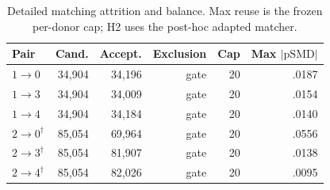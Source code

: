 \documentclass[notspecified,article,submit,moreauthors]{Definitions/mdpi}
\begin{document}
\begin{table}[H]
\caption{ROI-preservation and null-control checks. Exact ROI equality at the
final model input was a binding requirement; any violation would terminate the
run. All 30 configuration--seed evaluations completed without a violation. In
the ROI-only control, donor periphery is excluded, so a null HCS/HCE response is
the expected invariant output rather than an estimated biological effect.}
\label{tab:preservation}
\centering
\scriptsize
\setlength{\tabcolsep}{2.8pt}
\end{table}

\begin{table}[H]
\caption{Detailed matching attrition and balance. Max reuse is the frozen
per-donor cap; H2 uses the post-hoc adapted matcher.}
\label{tab:supp_matching}
\centering
\scriptsize
\begin{tabular}{@{}lrrrrr@{}}
\toprule
Pair & Cand. & Accept. & Exclusion & Cap & Max $|\mathrm{pSMD}|$ \\
\midrule
$1\rightarrow0$ & 34,904 & 34,196 & gate & 20 & .0187 \\
$1\rightarrow3$ & 34,904 & 34,009 & gate & 20 & .0154 \\
$1\rightarrow4$ & 34,904 & 34,184 & gate & 20 & .0140 \\
$2\rightarrow0^\dagger$ & 85,054 & 69,964 & gate & 20 & .0556 \\
$2\rightarrow3^\dagger$ & 85,054 & 81,907 & gate & 20 & .0138 \\
$2\rightarrow4^\dagger$ & 85,054 & 82,026 & gate & 20 & .0095 \\
\bottomrule
\end{tabular}
\end{table}
\end{document}
